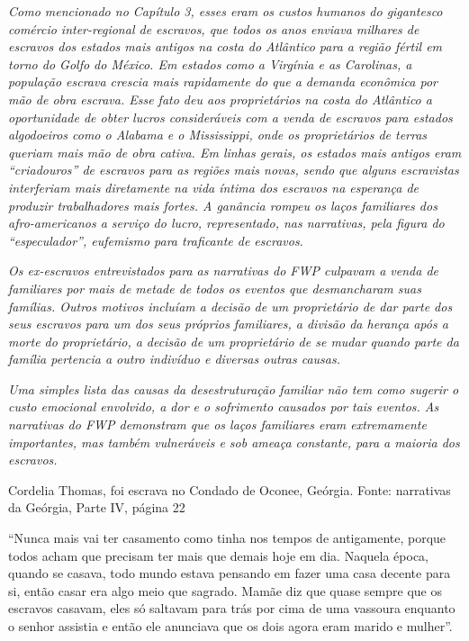 \emph{Como mencionado no Capítulo 3, esses eram os custos humanos do
gigantesco comércio inter-regional de escravos, que todos os anos
enviava milhares de escravos dos estados mais antigos na costa do
Atlântico para a região fértil em torno do Golfo do México. Em estados
como a Virgínia e as Carolinas, a população escrava crescia mais
rapidamente do que a demanda econômica por mão de obra escrava. Esse
fato deu aos proprietários na costa do Atlântico a oportunidade de obter
lucros consideráveis com a venda de escravos para estados algodoeiros
como o Alabama e o Mississippi, onde os proprietários de terras queriam
mais mão de obra cativa. Em linhas gerais, os estados mais antigos eram
``criadouros'' de escravos para as regiões mais novas, sendo que alguns
escravistas interferiam mais diretamente na vida íntima dos escravos na
esperança de produzir trabalhadores mais fortes. A ganância rompeu os
laços familiares dos afro-americanos a serviço do lucro, representado,
nas narrativas, pela figura do ``especulador'', eufemismo para
traficante de escravos. }

\emph{Os ex-escravos entrevistados para as narrativas do FWP culpavam a
venda de familiares por mais de metade de todos os eventos que
desmancharam suas famílias. Outros motivos incluíam a decisão de um
proprietário de dar parte dos seus escravos para um dos seus próprios
familiares, a divisão da herança após a morte do proprietário, a decisão
de um proprietário de se mudar quando parte da família pertencia a outro
indivíduo e diversas outras causas.}

\emph{Uma simples lista das causas da desestruturação familiar não tem
como sugerir o custo emocional envolvido, a dor e o sofrimento causados
por tais eventos. As narrativas do FWP demonstram que os laços
familiares eram extremamente importantes, mas também vulneráveis e sob
ameaça constante, para a maioria dos escravos.}

Cordelia Thomas, foi escrava no Condado de Oconee, Geórgia. Fonte:
narrativas da Geórgia, Parte IV, página 22

``Nunca mais vai ter casamento como tinha nos tempos de antigamente,
porque todos acham que precisam ter mais que demais hoje em dia. Naquela
época, quando se casava, todo mundo estava pensando em fazer uma casa
decente para si, então casar era algo meio que sagrado. Mamãe diz que
quase sempre que os escravos casavam, eles só saltavam para trás por
cima de uma vassoura enquanto o senhor assistia e então ele anunciava
que os dois agora eram marido e mulher''.

